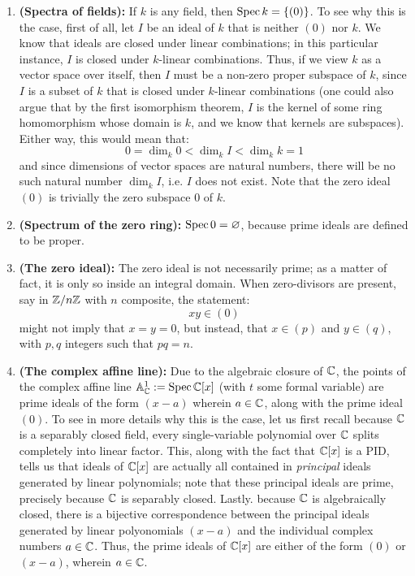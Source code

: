             \begin{example} \label{example: spectra_sets}
                \noindent
                \begin{enumerate}
                    \item \textbf{(Spectra of fields):} If $k$ is any field, then $\operatorname{Spec} k = \{(0)\}$. To see why this is the case, first of all, let $I$ be an ideal of $k$ that is neither $(0)$ nor $k$. We know that ideals are closed under linear combinations; in this particular instance, $I$ is closed under $k$-linear combinations. Thus, if we view $k$ as a vector space over itself, then $I$ must be a non-zero proper subspace of $k$, since $I$ is a subset of $k$ that is closed under $k$-linear combinations (one could also argue that by the first isomorphism theorem, $I$ is the kernel of some ring homomorphism whose domain is $k$, and we know that kernels are subspaces). Either way, this would mean that:
    					$$0 = \dim_k 0 < \dim_k I < \dim_k k = 1$$
    				and since dimensions of vector spaces are natural numbers, there will be no such natural number $\dim_k I$, i.e. $I$ does not exist. Note that the zero ideal $(0)$ is trivially the zero subspace $0$ of $k$.
    				\item \textbf{(Spectrum of the zero ring):} $\operatorname{Spec} 0 = \varnothing$, because prime ideals are defined to be proper.
    				\item \textbf{(The zero ideal):} The zero ideal is not necessarily prime; as a matter of fact, it is only so inside an integral domain. When zero-divisors are present, say in $\mathbb{Z}/n\mathbb{Z}$ with $n$ composite, the statement:
    				    $$xy \in (0)$$
				    might not imply that $x = y = 0$, but instead, that $x \in (p)$ and $y \in (q)$, with $p, q$ integers such that $pq = n$.
    				\item \textbf{(The complex affine line):} Due to the algebraic closure of $\mathbb{C}$, the points of the complex affine line $\mathbb{A}^1_{\mathbb{C}} := \operatorname{Spec} \mathbb{C}[x]$ (with $t$ some formal variable) are prime ideals of the form $(x - a)$ wherein $a \in \mathbb{C}$, along with the prime ideal $(0)$. To see in more details why this is the case, let us first recall because $\mathbb{C}$ is a separably closed field, every single-variable polynomial over $\mathbb{C}$ splits completely into linear factor. This, along with the fact that $\mathbb{C}[x]$ is a PID, tells us that ideals of $\mathbb{C}[x]$ are actually all contained in \textit{principal} ideals generated by linear polynomials; note that these principal ideals are prime, precisely because $\mathbb{C}$ is separably closed. Lastly. because $\mathbb{C}$ is algebraically closed, there is a bijective correspondence between the principal ideals generated by linear polyonomials $(x - a)$ and the individual complex numbers $a \in \mathbb{C}$. Thus, the prime ideals of $\mathbb{C}[x]$ are either of the form $(0)$ or $(x - a)$, wherein $a \in \mathbb{C}$. 

\end{enumerate}
\end{example}

